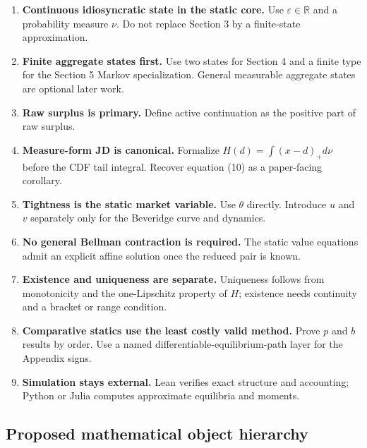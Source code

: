 \documentclass[11pt]{article}
\newcommand{\R}{\mathbb{R}}
\begin{document}
\begin{enumerate}
\item \textbf{Continuous idiosyncratic state in the static core.} Use $\varepsilon\in\R$ and a probability measure $\nu$. Do not replace Section 3 by a finite-state approximation.
\item \textbf{Finite aggregate states first.} Use two states for Section 4 and a finite type for the Section 5 Markov specialization. General measurable aggregate states are optional later work.
\item \textbf{Raw surplus is primary.} Define active continuation as the positive part of raw surplus.
\item \textbf{Measure-form JD is canonical.} Formalize $H(d)=\int(x-d)_+d\nu$ before the CDF tail integral. Recover equation (10) as a paper-facing corollary.
\item \textbf{Tightness is the static market variable.} Use $\theta$ directly. Introduce $u$ and $v$ separately only for the Beveridge curve and dynamics.
\item \textbf{No general Bellman contraction is required.} The static value equations admit an explicit affine solution once the reduced pair is known.
\item \textbf{Existence and uniqueness are separate.} Uniqueness follows from monotonicity and the one-Lipschitz property of $H$; existence needs continuity and a bracket or range condition.
\item \textbf{Comparative statics use the least costly valid method.} Prove $p$ and $b$ results by order. Use a named differentiable-equilibrium-path layer for the Appendix signs.
\item \textbf{Simulation stays external.} Lean verifies exact structure and accounting; Python or Julia computes approximate equilibria and moments.
\end{enumerate}

\subsection{Proposed mathematical object hierarchy}
\end{document}
